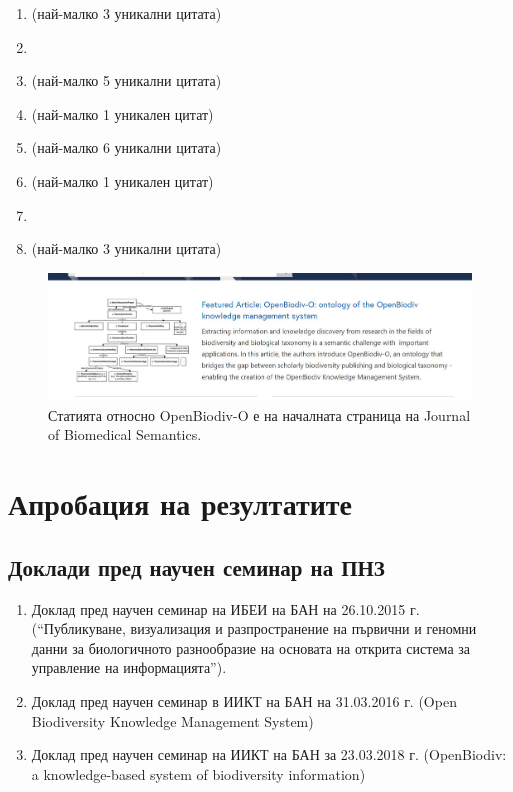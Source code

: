 \begingroup
{}
\setcounter{count}{99}
%

\begin{enumerate}
\item {} (най-малко 3 уникални цитата)
\item {}
\item {} (най-малко 5 уникални цитата)
\item {} (най-малко 1 уникален цитат)
\item {} (най-малко 6 уникални цитата)
\item {} (най-малко 1 уникален цитат)
\item {} 
\item {} (най-малко 3 уникални цитата)
\end{enumerate}
\endgroup

\begin{figure}
\centering
\includegraphics[width=\textwidth]{Figures/JBS-featured.jpg}
\decoRule
\caption{Статията относно OpenBiodiv-O е на началната страница на Journal of Biomedical Semantics.}
\label{fig:jbs-featured}
\end{figure}

\section*{Апробация на резултатите}

\subsection*{Доклади пред научен семинар на ПНЗ}

\begin{enumerate}
    \item Доклад пред научен семинар на ИБЕИ на БАН на 26.10.2015 г. (“Публикуване, визуализация и разпространение на първични и геномни данни за биологичното разнообразие на основата на открита система за управление на информацията”).
    \item Доклад пред научен семинар в ИИКТ на БАН на 31.03.2016 г. (Open Biodiversity Knowledge Management System)
    \item Доклад пред научен семинар на ИИКТ на БАН за 23.03.2018 г. (OpenBiodiv: a knowledge-based system of biodiversity information)
\end{enumerate}

